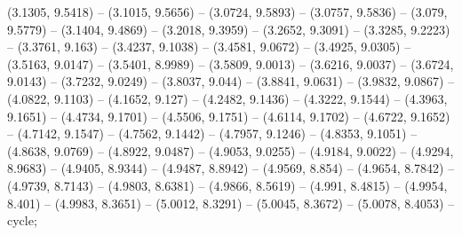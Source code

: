 (3.1305, 9.5418) -- (3.1015, 9.5656) -- (3.0724, 9.5893) -- (3.0757, 9.5836) -- (3.079, 9.5779) -- (3.1404, 9.4869) -- (3.2018, 9.3959) -- (3.2652, 9.3091) -- (3.3285, 9.2223) -- (3.3761, 9.163) -- (3.4237, 9.1038) -- (3.4581, 9.0672) -- (3.4925, 9.0305) -- (3.5163, 9.0147) -- (3.5401, 8.9989) -- (3.5809, 9.0013) -- (3.6216, 9.0037) -- (3.6724, 9.0143) -- (3.7232, 9.0249) -- (3.8037, 9.044) -- (3.8841, 9.0631) -- (3.9832, 9.0867) -- (4.0822, 9.1103) -- (4.1652, 9.127) -- (4.2482, 9.1436) -- (4.3222, 9.1544) -- (4.3963, 9.1651) -- (4.4734, 9.1701) -- (4.5506, 9.1751) -- (4.6114, 9.1702) -- (4.6722, 9.1652) -- (4.7142, 9.1547) -- (4.7562, 9.1442) -- (4.7957, 9.1246) -- (4.8353, 9.1051) -- (4.8638, 9.0769) -- (4.8922, 9.0487) -- (4.9053, 9.0255) -- (4.9184, 9.0022) -- (4.9294, 8.9683) -- (4.9405, 8.9344) -- (4.9487, 8.8942) -- (4.9569, 8.854) -- (4.9654, 8.7842) -- (4.9739, 8.7143) -- (4.9803, 8.6381) -- (4.9866, 8.5619) -- (4.991, 8.4815) -- (4.9954, 8.401) -- (4.9983, 8.3651) -- (5.0012, 8.3291) -- (5.0045, 8.3672) -- (5.0078, 8.4053) -- cycle;



